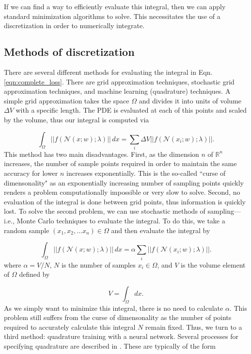 \documentclass{CUP-JNL-DTM}%
\theoremstyle{definition}
\numberwithin{equation}{section}
\newcommand{\net}{\mathcal{N}}
\begin{document}
If we can find a way to efficiently evaluate this integral, then we can apply standard minimization algorithms to solve. This necessitates the use of a discretization in order to numerically integrate. 

\subsection{Methods of discretization}

There are several different methods for evaluating the integral in Eqn. \ref{eqn:complete_loss}. There are grid approximation techniques, stochastic grid approximation techniques, and machine learning (quadrature) techniques. A simple grid approximation takes the space $\Omega$ and divides it into units of volume $\Delta V$ with a specific length. The PDE is evaluated at each of this points and scaled by the volume, thus our integral is computed via 

\begin{equation}
	\int_{\Omega} ||f(\net(x;w); \lambda)||\,dx = \sum_i \Delta V ||f(\net(x_i;w); \lambda)||.
\end{equation}
This method has two main disadvantages. First, as the dimension $n$ of $\mathbb{R}^n$ increases, the number of sample points required in order to maintain the same accuracy for lower $n$ increases exponentially. This is the so-called ``curse of dimensonality" as an exponentially increasing number of sampling points quickly renders a problem computationally impossible or very slow to solve. Second, no evaluation of the integral is done between grid points, thus information is quickly lost. To solve the second problem, we can use stochastic methods of sampling---i.e., Monte Carlo techniques to evaluate the integral. To do this, we take a random sample $(x_1, x_2, \dots x_n) \in \Omega$ and then evaluate the integral by

\begin{equation}
	\int_{\Omega} ||f(\net(x;w); \lambda)||\,dx = \alpha \sum_i ||f(\net(x_i;w); \lambda)||.
\end{equation}
where $\alpha = V/N$, $N$ is the number of samples $x_i \in \Omega$, and $V$ is the volume element of $\Omega$ defined by

\begin{equation}
    V = \int_{\Omega} dx. 
\end{equation}
As we simply want to minimize this integral, there is no need to calculate $\alpha$. This problem still suffers from the curse of dimensonality as the number of points required to accurately calculate this integral $N$ remain fixed. Thus, we turn to a third method: quadrature training with a neural network. Several processes for specifying quadrature are described in \cite{riveraQuadratureRulesSolving2022}. These are typically of the form 
\end{document}
